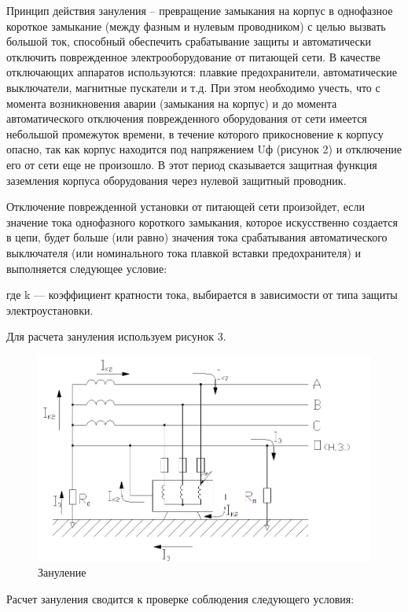 Принцип действия зануления – превращение замыкания на корпус в однофазное короткое замыкание (между фазным и нулевым проводником) с целью вызвать большой ток, способный обеспечить срабатывание защиты и автоматически отключить поврежденное электрооборудование от питающей сети. В качестве отключающих аппаратов используются: плавкие предохранители, автоматические выключатели, магнитные пускатели и т.д. При этом необходимо учесть, что с момента возникновения аварии (замыкания на корпус) и до момента автоматического отключения поврежденного оборудования от сети имеется небольшой промежуток времени, в течение которого прикосновение к корпусу опасно, так как корпус находится под напряжением Uф  (рисунок 2)  и отключение его от сети еще не произошло. В этот период сказывается защитная функция заземления корпуса оборудования через нулевой защитный проводник.

Отключение поврежденной установки от питающей сети произойдет, если значение тока однофазного короткого замыкания, которое искусственно создается в цепи, будет больше (или равно) значения тока срабатывания автоматического выключателя (или номинального тока плавкой вставки предохранителя) и выполняется следующее условие:

где k --- коэффициент кратности тока, выбирается в зависимости от типа защиты электроустановки.

Для расчета зануления используем рисунок 3.

\begin{figure}
  	\label{ot-zanul}
  	\centering
  	\includegraphics[width=1\textwidth]{images/ot-zanul2.png}
  	\caption{Зануление}
\end{figure}

Расчет зануления сводится к проверке соблюдения следующего условия:

